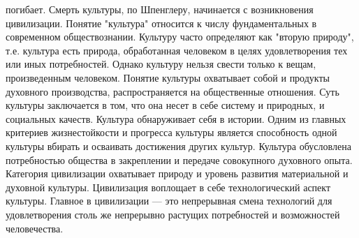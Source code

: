 \documentclass[12pt]{article}
\begin{document}
погибает. Смерть культуры, по Шпенглеру, начинается с возникновения цивилизации.
Понятие  "культура"  относится  к  числу  фундаментальных  в  современном  обществознании.  Культуру  часто
определяют как "вторую природу", т.е. культура есть природа, обработанная человеком в целях удовлетворения
тех  или  иных  потребностей.  Однако  культуру  нельзя  свести  только  к  вещам,  произведенным  человеком.
Понятие культуры охватывает собой и продукты духовного производства, распространяется на общественные
отношения. Суть культуры заключается в том, что она несет в себе систему и природных, и социальных качеств.
Культура обнаруживает себя в истории. Одним из главных критериев жизнестойкости и прогресса культуры
является способность одной культуры вбирать и осваивать достижения других культур. Культура обусловлена
потребностью общества в закреплении и передаче совокупного духовного опыта.
Категория  цивилизации  охватывает  природу  и  уровень  развития  материальной  и  духовной  культуры.
Цивилизация воплощает в себе технологический аспект культуры. Главное в цивилизации --- это непрерывная
смена  технологий  для  удовлетворения  столь  же  непрерывно  растущих  потребностей  и  возможностей
человечества.

\newpage
\end{document}
